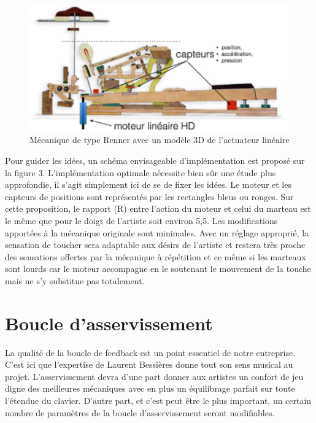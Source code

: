 \documentclass[french,a4paper,12pt]{report}
\begin{document}
	\begin{figure}[!ht]
    \center
   	\includegraphics[width=15cm]{MECA_PIANO3.png}
 		\caption{Mécanique de type Renner avec un modèle 3D de l’actuateur linéaire}
	\end{figure}

Pour guider les idées, un schéma envisageable d’implémentation est proposé sur la figure 3. L’implémentation optimale nécessite bien sûr une étude plus approfondie, il s’agit simplement ici de se de fixer les idées. Le moteur et les capteurs de positions sont représentés par les rectangles bleus ou rouges. Sur cette proposition, le rapport (R) entre l’action du moteur et celui du marteau est le même que pour le doigt de l’artiste soit environ 5,5. Les modifications apportées à la mécanique originale sont minimales. Avec un réglage approprié, la sensation de toucher sera adaptable aux désirs de l’artiste et restera très proche des sensations offertes par la mécanique à répétition et ce même si les marteaux sont lourds car le moteur accompagne en le soutenant le mouvement de la touche mais ne s’y substitue pas totalement.

  \section{Boucle d'asservissement}

La qualité de la boucle de feedback est un point essentiel de notre entreprise. C’est ici que l’expertise de Laurent Bessières donne tout son sens musical au projet. L’asservissement devra d’une part donner aux artistes un confort de jeu digne des meilleures mécaniques avec en plus un équilibrage parfait sur toute l’étendue du clavier. D’autre part, et c’est peut être le plus important, un certain nombre de paramètres de la boucle d’asservissement seront modifiables.
\end{document}
